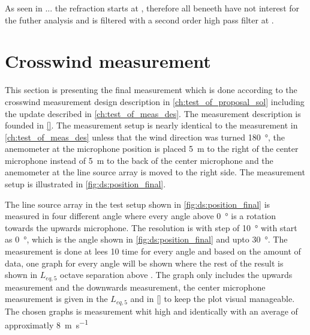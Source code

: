 

As seen in ... the refraction starts at , therefore all beneeth  have not interest for the futher analysis and is filtered with a second order high pass filter at . 




\section{Crosswind measurement}\label{mes:kudo:cross_mes}
This section is presenting the final measurement which is done according to the crosswind measurement design description in \autoref{ch:test_of_proposal_sol} including the update described in \autoref{ch:test_of_meas_des}. The measurement description is founded in \autoref{}. The measurement setup is nearly identical to the measurement in \autoref{ch:test_of_meas_des} unless that the wind direction was turned \SI{180}{\degree}, the anemometer at the microphone position is placed \SI{5}{\meter} to the right of the center microphone instead of \SI{5}{\meter} to the back of the center microphone and the anemometer at the line source array is moved to the right side. The measurement setup is illustrated in \autoref{fig:ds:position_final}.



The line source array in the test setup shown in \autoref{fig:ds:position_final} is measured in four different angle where every angle above \SI{0}{\degree} is a rotation towards the upwards microphone. The resolution is with step of \SI{10}{\degree} with start as \SI{0}{\degree}, which is the angle shown in \autoref{fig:ds:position_final} and upto \SI{30}{\degree}. The measurement is done at lees 10 time for every angle and based on the amount of data, one graph for every angle will be shown where the rest of the result is shown in $L_{eq,5}$ octave separation above . The graph only includes the upwards measurement and the downwards measurement, the center microphone measurement is given in the $L_{eq,5}$ and in \autoref{} to keep the plot visual manageable. The chosen graphs is measurement whit high and identically with an average of approximatly \SI{8}{\meter\per\second}


